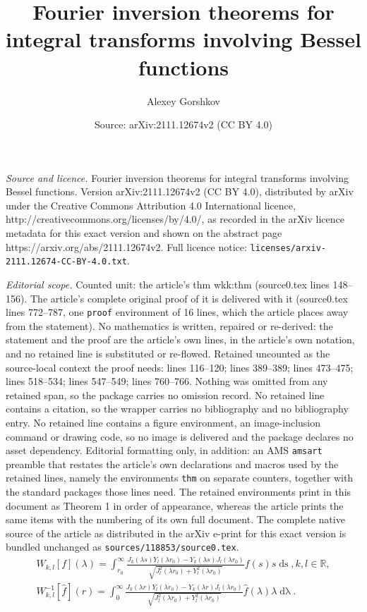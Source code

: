 \documentclass[10pt,a4paper]{amsart}
\title{Fourier inversion theorems for integral transforms involving Bessel functions}
\author{Alexey Gorshkov}
\date{Source: arXiv:2111.12674v2 (CC BY 4.0)}
\newcommand{\RM}{\mathbb{R}}
\newcommand{\dlambda}{\operatorname{d\lambda}}
\newcommand{\ds}{\operatorname{ds}}
\begin{document}
\maketitle

\noindent\emph{Source and licence.} Fourier inversion theorems for integral transforms involving Bessel functions. Version arXiv:2111.12674v2 (CC BY 4.0), distributed by arXiv under the Creative Commons Attribution 4.0 International licence, http://creativecommons.org/licenses/by/4.0/, as recorded in the arXiv licence metadata for this exact version and shown on the abstract page https://arxiv.org/abs/2111.12674v2. Full licence notice: \texttt{licenses/arxiv-2111.12674-CC-BY-4.0.txt}.\par\smallskip

\noindent\textit{Editorial scope.} Counted unit: the article's thm wkk:thm (source0.tex lines 148--156). The article's complete original proof of it is delivered with it (source0.tex lines 772--787, one \texttt{proof} environment of 16 lines, which the article places away from the statement). No mathematics is written, repaired or re-derived: the statement and the proof are the article's own lines, in the article's own notation, and no retained line is substituted or re-flowed.  Retained uncounted as the source-local context the proof needs: lines 116--120; lines 389--389; lines 473--475; lines 518--534; lines 547--549; lines 760--766.  Nothing was omitted from any retained span, so the package carries no omission record.  No retained line contains a citation, so the wrapper carries no bibliography and no bibliography entry.  No retained line contains a figure environment, an image-inclusion command or drawing code, so no image is delivered and the package declares no asset dependency.  Editorial formatting only, in addition: an AMS \texttt{amsart} preamble that restates the article's own declarations and macros used by the retained lines, namely the environments \texttt{thm} on separate counters, together with the standard packages those lines need.  The retained environments print in this document as Theorem 1 in order of appearance, whereas the article prints the same items with the numbering of its own full document.  The complete native source of the article as distributed in the arXiv e-print for this exact version is bundled unchanged as \texttt{sources/118853/source0.tex}.
\begin{align}\label{int:weberorr}
W_{k,l}[f](\lambda) = \int_{r_0}^\infty \frac{J_{k}(\lambda s)Y_{l}(\lambda r_0) - Y_{k}(\lambda s)J_{l}(\lambda r_0)}{\sqrt{J_{l}^2(\lambda r_0) + Y_{l}^2(\lambda r_0)}} f(s) s \ds,k,l\in \RM,
\\ \label{int:weberorrinv}
W^{-1}_{k,l}[\hat f](r) = \int_{0}^\infty \frac{J_{k}(\lambda r)Y_{l}(\lambda r_0) - Y_{k}(\lambda r)J_{l}(\lambda r_0)}{\sqrt{J_{l}^2(\lambda r_0) + Y_{l}^2(\lambda r_0)}} \hat f (\lambda) \lambda \dlambda.
\end{align}
\end{document}
